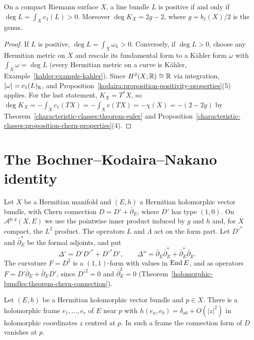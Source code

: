 \begin{proposition}\label{kodaira:proposition-positive-curves}
On a compact Riemann surface $X$, a line bundle $L$ is positive if and only if $\deg L = \int_Xc_1(L) > 0$. Moreover
$\deg K_X = 2g - 2$, where $g = b_1(X)/2$ is the genus.
\end{proposition}

\begin{proof}
If $L$ is positive, $\deg L = \int_X\omega_h > 0$. Conversely, if $\deg L > 0$, choose any Hermitian metric on $X$ and rescale its
fundamental form to a K\"ahler form $\omega$ with $\int_X\omega = \deg L$ (every Hermitian metric on a curve is K\"ahler,
Example~\ref{kahler:example-kahler}). Since $H^2(X; \mathbb{R}) \cong \mathbb{R}$ via integration, $[\omega] = c_1(L)_{\mathbb{R}}$, and
Proposition~\ref{kodaira:proposition-positivity-properties}(5) applies. For the last statement, $K_X = T^*X$, so
$\deg K_X = -\int_Xc_1(TX) = -\int_Xe(TX) = -\chi(X) = -(2 - 2g)$ by Theorem~\ref{characteristic-classes:theorem-euler} and
Proposition~\ref{characteristic-classes:proposition-chern-properties}(4).
\end{proof}

\section{The Bochner--Kodaira--Nakano identity}\label{kodaira:section-nakano}

\begin{notation}\label{kodaira:notation-bundle-valued}
Let $X$ be a Hermitian manifold and $(E, h)$ a Hermitian holomorphic vector bundle, with Chern connection $D = D' + \bar\partial_E$, where
$D'$ has type $(1,0)$. On $\mathcal{A}^{p,q}(X, E)$ we use the pointwise inner product induced by $g$ and $h$ and, for $X$ compact, the $L^2$
product. The operators $L$ and $\Lambda$ act on the form part. Let $D'^*$ and $\bar\partial_E^*$ be the formal adjoints, and put
\[
\Delta' = D'D'^* + D'^*D', \qquad \Delta'' = \bar\partial_E\bar\partial_E^* + \bar\partial_E^*\bar\partial_E .
\]
The curvature $F = D^2$ is a $(1,1)$-form with values in $\operatorname{End} E$, and as operators $F = D'\bar\partial_E + \bar\partial_ED'$, since
$D'^2 = 0$ and $\bar\partial_E^2 = 0$ (Theorem~\ref{holomorphic-bundles:theorem-chern-connection}).
\end{notation}

\begin{lemma}\label{kodaira:lemma-normal-frame}
Let $(E, h)$ be a Hermitian holomorphic vector bundle and $p \in X$. There is a holomorphic frame $e_1, \ldots, e_r$ of $E$ near $p$ with
$h(e_a, e_b) = \delta_{ab} + O(|z|^2)$ in holomorphic coordinates $z$ centred at $p$. In such a frame the connection form of $D$ vanishes at $p$.
\end{lemma}

